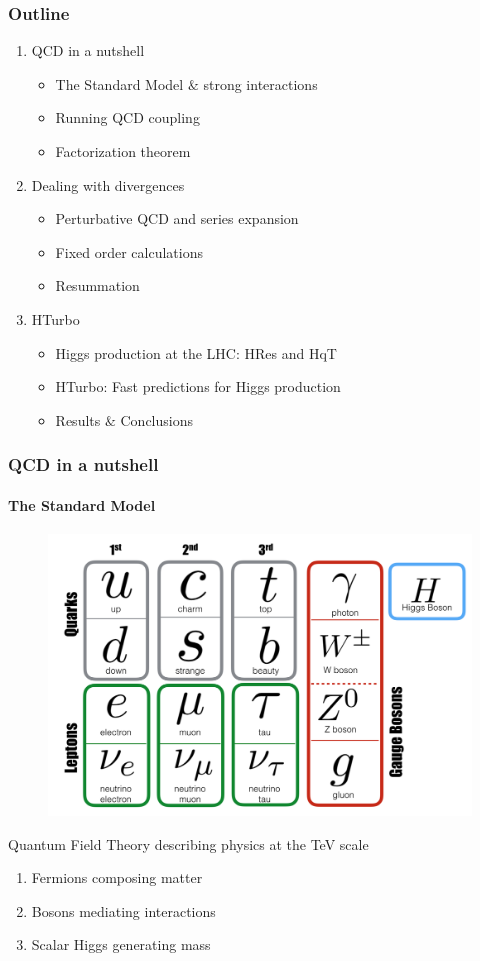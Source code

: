 \documentclass[aspectratio=43]{beamer}
\begin{document}
\begin{frame}

	\frametitle{Outline}
	
	\begin{enumerate}
		\item {\color{blue}QCD in a nutshell}
		\begin{itemize}
			\item The Standard Model $\&$ strong interactions
			\item Running QCD coupling
			\item Factorization theorem
		\end{itemize}
		\item {\color{blue}Dealing with divergences}
		\begin{itemize}
			\item Perturbative QCD and series expansion
			\item Fixed order calculations
			\item Resummation
		\end{itemize}
		\item {\color{blue}HTurbo}
		\begin{itemize}
			\item Higgs production at the LHC: HRes and HqT
			\item HTurbo: Fast predictions for Higgs production
			\item Results $\&$ Conclusions
		\end{itemize}
	\end{enumerate}
	
\end{frame}

\begin{frame}


\end{frame}

\begin{frame}

	\frametitle{QCD in a nutshell}
	\framesubtitle{The Standard Model}

	\begin{figure}
		\includegraphics[width = 6 cm]{plots/SM.png}
	\end{figure}
 
	
	Quantum Field Theory describing physics at the TeV scale
	\begin{enumerate}
		\item Fermions composing matter
		\item Bosons mediating interactions
		\item Scalar Higgs generating mass
	\end{enumerate}	
	
\end{frame}
\end{document}
